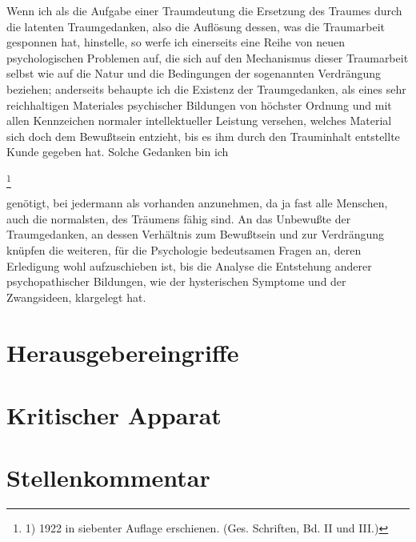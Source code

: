 \documentclass[twoside=true,titlepage=false,open=any, parskip=never, fontsize=10pt, headings=small, chapterprefix=false, appendixprefix=false]{scrbook}
\begin{document}
            
        \pstart
        Wenn ich als die Aufgabe einer Traumdeutung die Ersetzung des Traumes durch die
               latenten Traumgedanken, also die Auflösung dessen, was die
               Traumarbeit gesponnen hat, hinstelle, so werfe ich einerseits eine Reihe von
               neuen psychologischen Problemen auf, die sich auf den Mechanismus
               dieser Traumarbeit selbst wie auf die Natur und die Bedingungen der
               sogenannten Verdrängung beziehen; anderseits behaupte ich die Existenz der
               Traumgedanken, als eines sehr reichhaltigen Materiales psychischer Bildungen von
               höchster Ordnung und mit allen Kennzeichen normaler intellektueller Leistung
               versehen, welches Material sich doch dem Bewußtsein entzieht, bis es ihm durch
               den Trauminhalt entstellte Kunde gegeben hat. Solche Gedanken bin
               ich
        \pend
    
            
        \footnote{1) 1922 in siebenter Auflage
               erschienen. (Ges. Schriften, Bd. II und III.)}
    
         
            
            
            
        \pstart
        genötigt, bei jedermann als vorhanden anzunehmen, da ja fast alle
               Menschen, auch die normalsten, des Träumens fähig sind. An das Unbewußte der
               Traumgedanken, an dessen Verhältnis zum Bewußtsein und zur Verdrängung knüpfen
               die weiteren, für die Psychologie bedeutsamen Fragen an, deren Erledigung
               wohl aufzuschieben ist, bis die Analyse die Entstehung anderer psychopathischer Bildungen, wie der hysterischen Symptome und der
               Zwangsideen, klargelegt hat.
        \pend
    
         
        \endnumbering
        
        \section*{Herausgebereingriffe}
  
        \section*{Kritischer Apparat}
        
        \section*{Stellenkommentar}
        
        \printindex[person]
        \printindex[kw]
        


        
\end{document}
